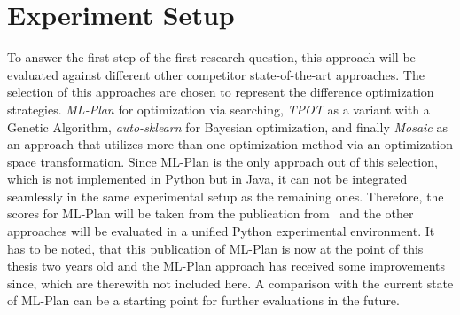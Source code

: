 \section{Experiment Setup}
\label{sec:evaluation:setup}
To answer the first step of the first research question, this approach will be evaluated against different other competitor state-of-the-art approaches.
The selection of this approaches are chosen to represent the difference optimization strategies.
\textit{ML-Plan} for optimization via searching, \textit{TPOT} as a variant with a Genetic Algorithm, \textit{auto-sklearn} for Bayesian optimization, and finally \textit{Mosaic} as an approach that utilizes more than one optimization method via an optimization space transformation.\newline
Since ML-Plan is the only approach out of this selection, which is not implemented in Python but in Java, it can not be integrated seamlessly in the same experimental setup as the remaining ones.
Therefore, the scores for ML-Plan will be taken from the publication from~\textcite{Mohr-ML-Plan} and the other approaches will be evaluated in a unified Python experimental environment.
It has to be noted, that this publication of ML-Plan is now at the point of this thesis two years old and the ML-Plan approach has received some improvements since, which are therewith not included here.
A comparison with the current state of ML-Plan can be a starting point for further evaluations in the future.

